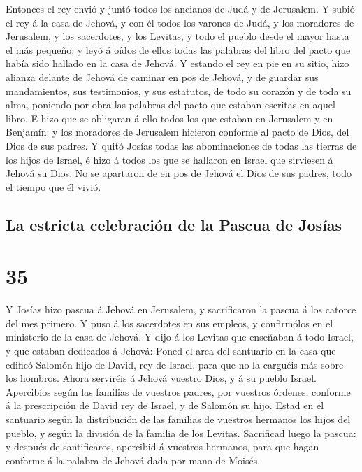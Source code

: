  Entonces el rey envió y juntó todos los ancianos de Judá
y de Jerusalem.  Y subió el rey á la casa de Jehová, y
con él todos los varones de Judá, y los moradores de Jerusalem, y los
sacerdotes, y los Levitas, y todo el pueblo desde el mayor hasta el más
pequeño; y leyó á oídos de ellos todas las palabras del libro del pacto
que había sido hallado en la casa de Jehová.  Y estando
el rey en pie en su sitio, hizo alianza delante de Jehová de caminar en
pos de Jehová, y de guardar sus mandamientos, sus testimonios, y sus
estatutos, de todo su corazón y de toda su alma, poniendo por obra las
palabras del pacto que estaban escritas en aquel libro. 
E hizo que se obligaran á ello todos los que estaban en Jerusalem y en
Benjamín: y los moradores de Jerusalem hicieron conforme al pacto de
Dios, del Dios de sus padres.  Y quitó Josías todas las
abominaciones de todas las tierras de los hijos de Israel, é hizo á
todos los que se hallaron en Israel que sirviesen á Jehová su Dios. No
se apartaron de en pos de Jehová el Dios de sus padres, todo el tiempo
que él vivió.

\hypertarget{la-estricta-celebraciuxf3n-de-la-pascua-de-josuxedas}{%
\subsection{La estricta celebración de la Pascua de
Josías}\label{la-estricta-celebraciuxf3n-de-la-pascua-de-josuxedas}}

\hypertarget{section-14-35}{%
\section{35}\label{section-14-35}}

 Y Josías hizo pascua á Jehová en Jerusalem, y
sacrificaron la pascua á los catorce del mes primero.  Y
puso á los sacerdotes en sus empleos, y confirmólos en el ministerio de
la casa de Jehová.  Y dijo á los Levitas que enseñaban á
todo Israel, y que estaban dedicados á Jehová: Poned el arca del
santuario en la casa que edificó Salomón hijo de David, rey de Israel,
para que no la carguéis más sobre los hombros. Ahora serviréis á Jehová
vuestro Dios, y á su pueblo Israel.  Apercibíos según las
familias de vuestros padres, por vuestros órdenes, conforme á la
prescripción de David rey de Israel, y de Salomón su hijo.
 Estad en el santuario según la distribución de las
familias de vuestros hermanos los hijos del pueblo, y según la división
de la familia de los Levitas.  Sacrificad luego la pascua:
y después de santificaros, apercibid á vuestros hermanos, para que hagan
conforme á la palabra de Jehová dada por mano de Moisés.

